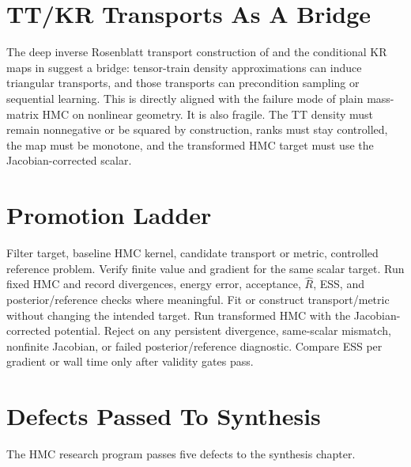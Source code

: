 \section{TT/KR Transports As A Bridge}
\label{sec:bf-hd-tt-kr-hmc}

The deep inverse Rosenblatt transport construction of \citet{cui2021deep} and
the conditional KR maps in \citet{zhao2024ttsequential} suggest a bridge:
tensor-train density approximations can induce triangular transports, and those
transports can precondition sampling or sequential learning.  This is directly
aligned with the failure mode of plain mass-matrix HMC on nonlinear geometry.
It is also fragile.  The TT density must remain nonnegative or be squared by
construction, ranks must stay controlled, the map must be monotone, and the
transformed HMC target must use the Jacobian-corrected scalar.

\section{Promotion Ladder}
\label{sec:bf-hd-hmc-ladder}

\begin{algorithm}
\caption{Transport/HMC promotion ladder for nonlinear SSMs}
\label{alg:bf-hd-hmc-ladder}
\begin{algorithmic}[1]
\Require Filter target, baseline HMC kernel, candidate transport or metric,
  controlled reference problem.
\State Verify finite value and gradient for the same scalar target.
\State Run fixed HMC and record divergences, energy error, acceptance,
  $\widehat R$, ESS, and posterior/reference checks where meaningful.
\State Fit or construct transport/metric without changing the intended target.
\State Run transformed HMC with the Jacobian-corrected potential.
\State Reject on any persistent divergence, same-scalar mismatch, nonfinite
  Jacobian, or failed posterior/reference diagnostic.
\State Compare ESS per gradient or wall time only after validity gates pass.
\end{algorithmic}
\end{algorithm}

\section{Defects Passed To Synthesis}
\label{sec:bf-hd-hmc-defects}

The HMC research program passes five defects to the synthesis chapter.

